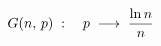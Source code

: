 \documentclass[preview]{standalone}
\begin{document}
\begin{align*}
\special{dvisvgm:raw <g id='unique000'>}G(n,\,p) \;:\quad p \;\longrightarrow\; \frac{\ln n}{n}\special{dvisvgm:raw </g>}
\end{align*}
\end{document}
